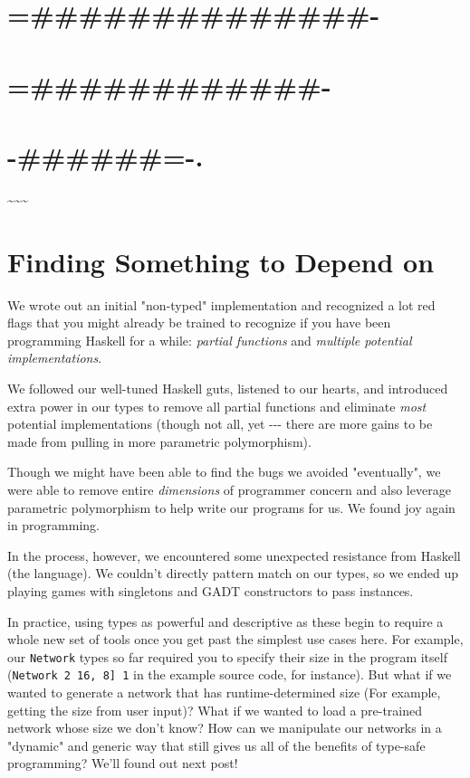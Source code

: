 \documentclass[]{article}
\begin{document}
\section{=\#\#\#\#\#\#\#\#\#\#\#\#\#\#-}

\section{=\#\#\#\#\#\#\#\#\#\#\#\#-}

\section{-\#\#\#\#\#\#=-.}

\textasciitilde{}\textasciitilde{}\textasciitilde{}

\section{Finding Something to Depend on}

We wrote out an initial "non-typed" implementation and recognized a lot red
flags that you might already be trained to recognize if you have been
programming Haskell for a while: \emph{partial functions} and \emph{multiple
potential implementations}.

We followed our well-tuned Haskell guts, listened to our hearts, and introduced
extra power in our types to remove all partial functions and eliminate
\emph{most} potential implementations (though not all, yet -\/-\/- there are
more gains to be made from pulling in more parametric polymorphism).

Though we might have been able to find the bugs we avoided "eventually", we were
able to remove entire \emph{dimensions} of programmer concern and also leverage
parametric polymorphism to help write our programs for us. We found joy again in
programming.

In the process, however, we encountered some unexpected resistance from Haskell
(the language). We couldn't directly pattern match on our types, so we ended up
playing games with singletons and GADT constructors to pass instances.

In practice, using types as powerful and descriptive as these begin to require a
whole new set of tools once you get past the simplest use cases here. For
example, our \texttt{Network} types so far required you to specify their size in
the program itself (\texttt{Network\ 2\ \textquotesingle{}{[}16,\ 8{]}\ 1} in
the example source code, for instance). But what if we wanted to generate a
network that has runtime-determined size (For example, getting the size from
user input)? What if we wanted to load a pre-trained network whose size we don't
know? How can we manipulate our networks in a "dynamic" and generic way that
still gives us all of the benefits of type-safe programming? We'll found out
next post!
\end{document}
